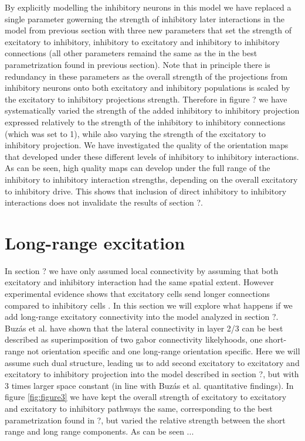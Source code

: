 \documentclass[a4paper,10pt]{article}
\begin{document}
By explicitly modelling the inhibitory neurons in this model we have replaced a single parameter gowerning the strength of inhibitory
later interactions in the model from previous section with three new parameters that set the strength of excitatory to inhibitory,
inhibitory to excitatory and inhibitory to inhibitory connections (all other parameters remaind the same as the 
in the best parametrization found in previous section). Note that in principle there is redundancy in these parameters as
the overall strength of the projections from inhibitory neurons onto both excitatory and inhibitory populations is scaled by the 
excitatory to inhibitory projections strength. Therefore in figure ? we have systematically varied the strength of the added inhibitory to inhibitory
projection expressed relatively to the strength of the inhibitory to inhibitory connections (which was set to 1), while also varying the 
strength of the excitatory to inhibitory projection. We have  investigated the quality of the orientation 
maps that developed under these different levels of inhibitory to inhibitory interactions. As can be seen, high quality maps 
can develop under the full range of the inhibitory to inhibitory interaction strengths, depending on the overall 
excitatory to inhibitory drive. This shows that inclusion of direct inhibitory to inhibitory interactions does not 
invalidate the results of section ?.

\section{Long-range excitation}

In section ? we have only assumed local connectivity by assuming that both excitatory and inhibitory interaction had the same spatial extent. 
However experimental evidence shows that excitatory cells send longer connections compared to inhibitory cells \cite{?}. In this section we will
explore what happens if we add long-range excitatory connectivity into the model analyzed in section ?. Buz\'as et al. \cite{Buzas2006} have shown that
the lateral connectivity in layer 2/3 can be best described as superimposition of two gabor connectivity likelyhoods, one short-range not orientation specific
and one long-range orientation specific. Here we will assume such dual structure, leading us to add second excitatory to excitatory and excitatory to inhibitory
projection into the model described in section ?, but with 3 times larger space constant (in line with Buz\'as et al. quantitative findings). In figure \ref{fig:figure3} we have 
kept the overall strength of excitatory to excitatory and excitatory to inhibitory pathways the same, corresponding to the best parametrization found in ?,
but varied the relative strength between the short range and long range components. As can be seen ...
\end{document}
